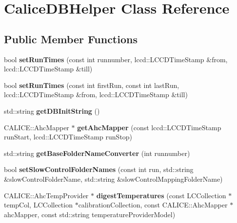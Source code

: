\section{Calice\-D\-B\-Helper Class Reference}
\label{classCaliceDBHelper}
\subsection*{Public Member Functions}
\begin{DoxyCompactItemize}
\item 
bool {\bfseries set\-Run\-Times} (const int runnumber, lccd\-::\-L\-C\-C\-D\-Time\-Stamp \&from, lccd\-::\-L\-C\-C\-D\-Time\-Stamp \&till)\label{classCaliceDBHelper_a107d349f9ddcd721309826400c4c70e1}

\item 
bool {\bfseries set\-Run\-Times} (const int first\-Run, const int last\-Run, lccd\-::\-L\-C\-C\-D\-Time\-Stamp \&from, lccd\-::\-L\-C\-C\-D\-Time\-Stamp \&till)\label{classCaliceDBHelper_a1cabf00565c1304db58b05155f080817}

\item 
std\-::string {\bfseries get\-D\-B\-Init\-String} ()\label{classCaliceDBHelper_a1adb85c607648d3ee13f0a98f826bf9f}

\item 
C\-A\-L\-I\-C\-E\-::\-Ahc\-Mapper $\ast$ {\bfseries get\-Ahc\-Mapper} (const lccd\-::\-L\-C\-C\-D\-Time\-Stamp run\-Start, lccd\-::\-L\-C\-C\-D\-Time\-Stamp run\-Stop)\label{classCaliceDBHelper_a8cbc72dbacd14c55b5e0ba23f75cd280}

\item 
std\-::string {\bfseries get\-Base\-Folder\-Name\-Converter} (int runnumber)\label{classCaliceDBHelper_afaa757644bbf45b4269852d6357c427a}

\item 
bool {\bfseries set\-Slow\-Control\-Folder\-Names} (const int run, std\-::string \&slow\-Control\-Folder\-Name, std\-::string \&slow\-Control\-Mapping\-Folder\-Name)\label{classCaliceDBHelper_a696c0b3c0420b3a1306d3432acab7489}

\item 
C\-A\-L\-I\-C\-E\-::\-Ahc\-Temp\-Provider $\ast$ {\bfseries digest\-Temperatures} (const L\-C\-Collection $\ast$temp\-Col, L\-C\-Collection $\ast$calibration\-Collection, const C\-A\-L\-I\-C\-E\-::\-Ahc\-Mapper $\ast$ahc\-Mapper, const std\-::string temperature\-Provider\-Model)\label{classCaliceDBHelper_ab0b41b5afbae58c58622081d981b9869}

\end{DoxyCompactItemize}


